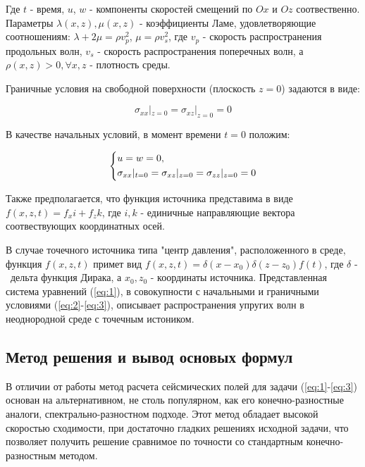 Где $t$ - время, $u$, $w$ - компоненты скоростей смещений по $Ox$ и $Oz$ соотвественно.
Параметры $\lambda(x,z), \mu(x,z)$ - коэффициенты Ламе, удовлетворяющие соотношениям: $\lambda + 2\mu=\rho{v}_p^2$, $\mu=\rho{v}_s^2$, 
где $v_p$ - скорость распространения продольных волн, $v_s$ - скорость распространения поперечных волн,
а $\rho(x,z)>0, \forall x,z$ - плотность среды.

Граничные условия на свободной поверхности (плоскость $z = 0$) задаются в виде:

\begin{equation}
	\label{eq:2}
	\sigma_{xx}|_{z=0}=\sigma_{xz}|_{z=0}=0
\end{equation}

В качестве начальных условий, в момент времени $t=0$ положим:

\begin{equation}
\begin{dcases}
	\label{eq:3}
	u = w = 0, \\
	\sigma_{xx}|_{t=0}=\sigma_{xz}|_{z=0}=\sigma_{zz}|_{z=0}=0
\end{dcases}
\end{equation}

Также предполагается, что функция источника представима в виде $f(x,z,t)=f_xi+f_zk$,
где $i, k$ - единичные направляющие вектора соотвествующих координатных осей.

В случае точечного источника типа "центр давления", расположенного в среде, функция $f(x,z,t)$ примет вид $f(x,z,t)=\delta(x-x_0)\delta(z-z_0)f(t)$,
где $\delta$ -  дельта функция Дирака, а $x_0, z_0$ - координаты источника.
Представленная система уравнений (\ref{eq:1}), в совокупности с начальными и граничными условиями (\ref{eq:2}-\ref{eq:3}),
описывает распространения упругих волн в неоднородной среде с точечным истоником.
\subsection{Метод решения и вывод основых формул}
В отличии от работы \cite{karavaev} метод расчета сейсмических полей для задачи (\ref{eq:1}-\ref{eq:3}) основан на альтернативном,
не столь популярном, как его конечно-разностные аналоги, спектрально-разностном подходе. Этот метод обладает высокой скоростью сходимости,
при достаточно гладких решениях исходной задачи, что позволяет получить решение сравнимое по точности со стандартным
конечно-разностным методом.

